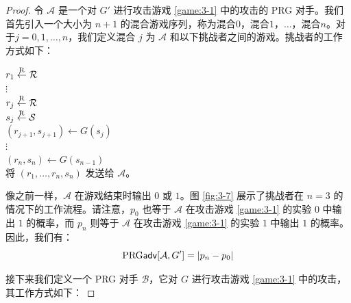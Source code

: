 \begin{proof}
令 $\mathcal A$ 是一个对 $G'$ 进行攻击游戏 \ref{game:3-1} 中的攻击的 PRG 对手。我们首先引入一个大小为 $n+1$ 的混合游戏序列，称为混合$0$，混合$1$，$\dots$，混合$n$。对于$j=0,1,\dots,n$，我们定义混合 $j$ 为 $\mathcal A$ 和以下挑战者之间的游戏。挑战者的工作方式如下：

\vspace*{5pt}

\hspace*{5pt} $r_1\overset{\rm R}\leftarrow\mathcal R$\\
\hspace*{50pt} $\vdots$\\
\hspace*{26pt} $r_j\overset{\rm R}\leftarrow\mathcal R$\\
\hspace*{26pt} $s_j\overset{\rm R}\leftarrow\mathcal S$\\
\hspace*{26pt} $(r_{j+1},s_{j+1})\leftarrow G(s_{j})$\\
\hspace*{50pt} $\vdots$\\
\hspace*{26pt} $(r_n,s_{n})\leftarrow G(s_{n-1})$\\
\hspace*{26pt} 将 $(r_1,\dots,r_n,s_n)$ 发送给 $\mathcal A$。

\vspace*{5pt}

\noindent
像之前一样，$\mathcal A$ 在游戏结束时输出 $0$ 或 $1$。图 \ref{fig:3-7} 展示了挑战者在 $n=3$ 的情况下的工作流程。请注意，$p_0$ 也等于 $\mathcal A$ 在攻击游戏 \ref{game:3-1} 的实验 $0$ 中输出 $1$ 的概率，而 $p_n$ 则等于 $\mathcal A$ 在攻击游戏 \ref{game:3-1} 的实验 $1$ 中输出 $1$ 的概率。因此，我们有：
\begin{equation}
{\rm PRG\mathsf{adv}}[\mathcal{A},G']=|p_n-p_0|
\end{equation}

接下来我们定义一个 PRG 对手 $\mathcal B$，它对 $G$ 进行攻击游戏 \ref{game:3-1} 中的攻击，其工作方式如下：

\vspace*{5pt}


\end{proof}
